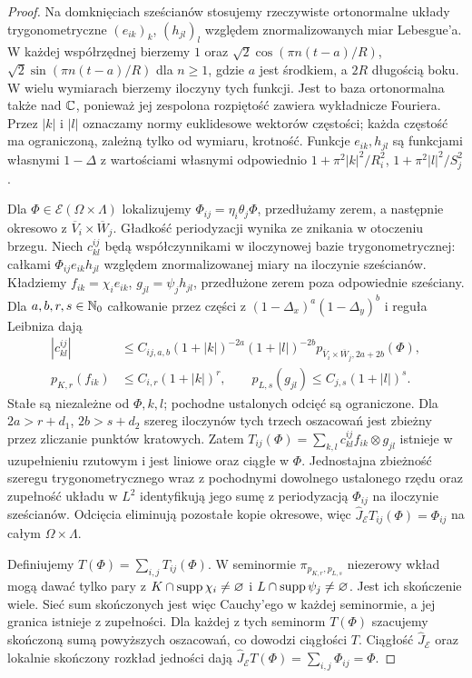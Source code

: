 \begin{proof}
Na domknięciach sześcianów stosujemy rzeczywiste
ortonormalne układy trygonometryczne $(e_{ik})_k$,
$(h_{jl})_l$ względem znormalizowanych miar Lebesgue'a.
W każdej współrzędnej bierzemy $1$ oraz
$\sqrt2\cos(\pi n(t-a)/R)$, $\sqrt2\sin(\pi n(t-a)/R)$
dla $n\ge1$, gdzie $a$ jest środkiem, a $2R$ długością
boku. W wielu wymiarach bierzemy iloczyny tych funkcji.
Jest to baza ortonormalna także nad $\mathbb C$, ponieważ
jej zespolona rozpiętość zawiera wykładnicze Fouriera.
Przez $|k|$ i $|l|$ oznaczamy normy euklidesowe
wektorów częstości; każda częstość ma ograniczoną,
zależną tylko od wymiaru, krotność.
Funkcje $e_{ik},h_{jl}$ są funkcjami własnymi
$1-\Delta$ z wartościami własnymi odpowiednio
$1+\pi^2|k|^2/R_i^2$, $1+\pi^2|l|^2/S_j^2$.

Dla $\Phi\in\mathcal E(\Omega\times\Lambda)$
lokalizujemy $\Phi_{ij}=\eta_i\theta_j\Phi$,
przedłużamy zerem, a następnie okresowo z
$\overline V_i\times\overline W_j$.
Gładkość periodyzacji wynika ze znikania w otoczeniu
brzegu. Niech $c_{kl}^{ij}$ będą współczynnikami
w iloczynowej bazie trygonometrycznej: całkami
$\Phi_{ij}e_{ik}h_{jl}$ względem znormalizowanej
miary na iloczynie sześcianów. Kładziemy
$f_{ik}=\chi_i e_{ik}$, $g_{jl}=\psi_j h_{jl}$,
przedłużone zerem poza odpowiednie sześciany.
Dla $a,b,r,s\in\mathbb N_0$ całkowanie przez części z
$(1-\Delta_x)^a(1-\Delta_y)^b$ i reguła Leibniza dają
\[
 \begin{aligned}
 |c_{kl}^{ij}|&\le C_{ij,a,b}(1+|k|)^{-2a}
 (1+|l|)^{-2b}
 p_{\overline V_i\times\overline W_j,2a+2b}(\Phi),\\
 p_{K,r}(f_{ik})&\le C_{i,r}(1+|k|)^r,\qquad
 p_{L,s}(g_{jl})\le C_{j,s}(1+|l|)^s.
 \end{aligned}
\]
Stałe są niezależne od $\Phi,k,l$; pochodne ustalonych
odcięć są ograniczone. Dla $2a>r+d_1$, $2b>s+d_2$
szereg iloczynów tych trzech oszacowań jest zbieżny
przez zliczanie punktów kratowych.
Zatem
$T_{ij}(\Phi)=\sum_{k,l}c_{kl}^{ij}f_{ik}\otimes g_{jl}$
istnieje w uzupełnieniu rzutowym i jest liniowe
oraz ciągłe w $\Phi$.
Jednostajna zbieżność szeregu trygonometrycznego
wraz z pochodnymi dowolnego ustalonego rzędu oraz
zupełność układu w $L^2$ identyfikują jego sumę
z periodyzacją $\Phi_{ij}$ na iloczynie sześcianów.
Odcięcia eliminują pozostałe kopie okresowe, więc
$\widehat J_{\mathcal E}T_{ij}(\Phi)=\Phi_{ij}$
na całym $\Omega\times\Lambda$.

Definiujemy $T(\Phi)=\sum_{i,j}T_{ij}(\Phi)$.
W seminormie $\pi_{p_{K,r},p_{L,s}}$ niezerowy wkład
mogą dawać tylko pary z
$K\cap\operatorname{supp}\chi_i\ne\varnothing$ i
$L\cap\operatorname{supp}\psi_j\ne\varnothing$.
Jest ich skończenie wiele. Sieć sum skończonych
jest więc Cauchy'ego w każdej seminormie, a jej
granica istnieje z zupełności.
Dla każdej z tych seminorm $T(\Phi)$ szacujemy
skończoną sumą powyższych oszacowań, co dowodzi
ciągłości $T$. Ciągłość $\widehat J_{\mathcal E}$
oraz lokalnie skończony rozkład jedności dają
$\widehat J_{\mathcal E}T(\Phi)=\sum_{i,j}\Phi_{ij}=\Phi$.


\end{proof}
